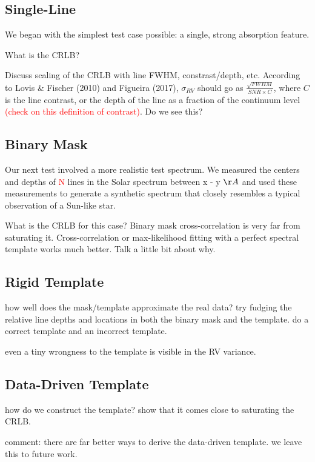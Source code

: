 \documentclass[modern]{aastex61}
\newcommand{\todo}[1]{\textcolor{red}{#1}}  %
\begin{document}
\subsection{Single-Line}
\label{s:singleline}

We began with the simplest test case possible: a single, strong absorption feature.

What is the CRLB?

Discuss scaling of the CRLB with line FWHM, constrast/depth, etc. According to Lovis \& Fischer (2010) and Figueira (2017), $\sigma_{RV}$ should go as $\frac{\sqrt{FWHM}}{SNR \times C}$, where $C$ is the line contrast, or the depth of the line as a fraction of the continuum level \todo{(check on this definition of contrast)}. Do we see this?

\subsection{Binary Mask}

Our next test involved a more realistic test spectrum. We measured the centers and depths of \todo{N} lines in the Solar spectrum between {x - y} $\AA$ and used these measurements to generate a synthetic spectrum that closely resembles a typical observation of a Sun-like star.

What is the CRLB for this case? Binary mask cross-correlation is very far from saturating it. Cross-correlation or max-likelihood fitting with a perfect spectral template works much better. Talk a little bit about why.

\subsection{Rigid Template}

how well does the mask/template approximate the real data? try fudging the relative line depths and locations in both the binary mask and the template. do a correct template and an incorrect template.

even a tiny wrongness to the template is visible in the RV variance.

\subsection{Data-Driven Template}

how do we construct the template? show that it comes close to saturating the CRLB.

comment: there are far better ways to derive the data-driven template. we leave this to future work.
\end{document}
